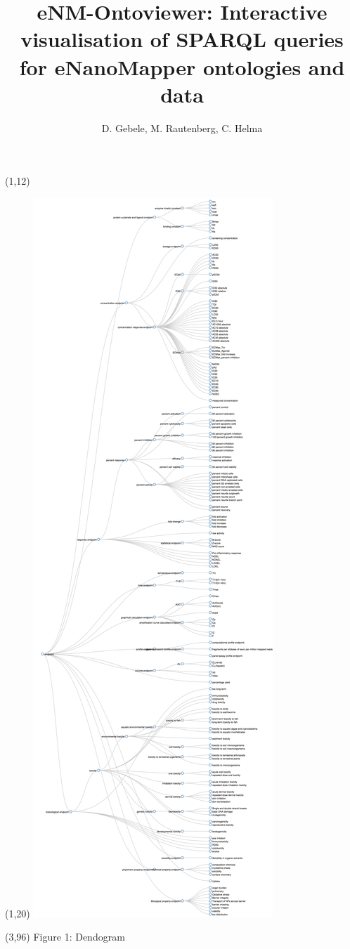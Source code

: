 \documentclass[final]{beamer}
\title{eNM-Ontoviewer: Interactive visualisation of SPARQL queries for eNanoMapper ontologies and data}
\author{D. Gebele, M. Rautenberg, C. Helma}
\institute{\emph{in silico} toxicology gmbh, Basel, Switzerland}
\begin{document}
  \begin{frame}{}

    \begin{textblock}{81.5}(1,12)
      \justifying
      
    \end{textblock}
    
    \begin{textblock}{30}(1,20)
      \includegraphics[scale=0.35,trim={20cm 0 0 0},clip]{onto-viewer-dendogram-1.png}
    \end{textblock}
    \begin{textblock}{40}(3,96)
      \small Figure 1: Dendogram
    \end{textblock}
    

\end{frame}
\end{document}
